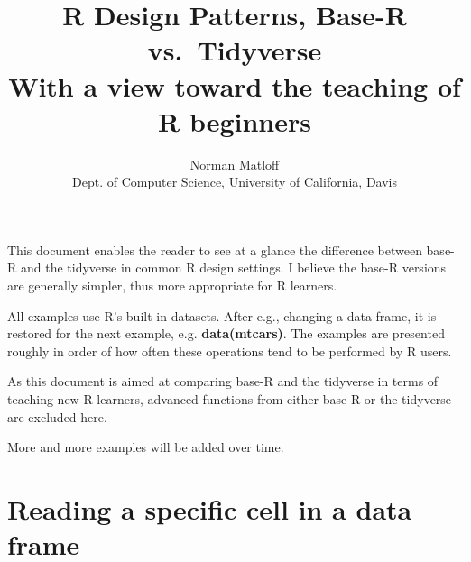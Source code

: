 \documentclass[11pt]{article}
\title{R Design Patterns, Base-R vs.\ Tidyverse \\
   With a view toward the teaching of R beginners}
\author{Norman Matloff \\
      Dept. of Computer Science, University of California, Davis}
\begin{document}
\maketitle

This document enables the reader to see at a glance the difference
between base-R and the tidyverse in common R design settings.  I believe
the base-R versions are generally simpler, thus more appropriate for R
learners.

All examples use R's built-in datasets.  After e.g., changing a data
frame, it is restored for the next example, e.g. \textbf{data(mtcars)}.
The examples are presented roughly in order of how often these
operations tend to be performed by R users.

As this document is aimed at comparing base-R and the tidyverse in terms
of teaching new R learners, advanced functions from either base-R or the
tidyverse are excluded here.

More and more examples will be added over time.

\section*{Reading a specific cell in a data frame}



\begin{parcolumns}[rulebetween=true]{2}


\hspace{0.1in}


\end{parcolumns}
\end{document}
